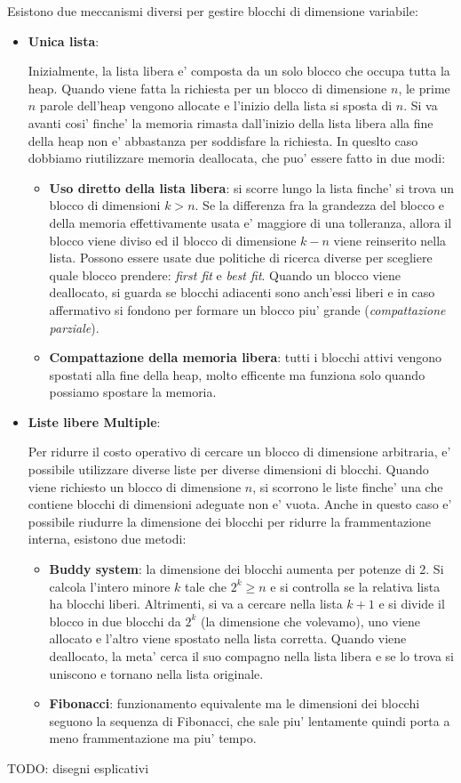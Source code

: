 Esistono due meccanismi diversi per gestire blocchi di dimensione variabile:
\begin{itemize}
\item \textbf{Unica lista}: 

  Inizialmente, la lista libera e' composta da un solo blocco che occupa tutta la heap. Quando viene fatta la richiesta per un blocco di dimensione $ n $, le prime $ n $ parole dell'heap vengono allocate e l'inizio della lista si sposta di $ n $. Si va avanti cosi' finche' la memoria rimasta dall'inizio della lista libera alla fine della heap non e' abbastanza per soddisfare la richiesta. In queslto caso dobbiamo riutilizzare memoria deallocata, che puo' essere fatto in due modi:
    \begin{itemize}
      \item \textbf{Uso diretto della lista libera}: si scorre lungo la lista finche' si trova un blocco di dimensioni $ k > n $. Se la differenza fra la grandezza del blocco e della memoria effettivamente usata e' maggiore di una tolleranza, allora il blocco viene diviso ed il blocco di dimensione $ k - n $ viene reinserito nella lista. Possono essere usate due politiche di ricerca diverse per scegliere quale blocco prendere: \textit{first fit} e \textit{best fit}. Quando un blocco viene deallocato, si guarda se blocchi adiacenti sono anch'essi liberi e in caso affermativo si fondono per formare un blocco piu' grande (\textit{compattazione parziale}).
      \item \textbf{Compattazione della memoria libera}: tutti i blocchi attivi vengono spostati alla fine della heap, molto efficente ma funziona solo quando possiamo spostare la memoria.
    \end{itemize}
  \item \textbf{Liste libere Multiple}:

    Per ridurre il costo operativo di cercare un blocco di dimensione arbitraria, e' possibile utilizzare diverse liste per diverse dimensioni di blocchi. Quando viene richiesto un blocco di dimensione $ n $, si scorrono le liste finche' una che contiene blocchi di dimensioni adeguate non e' vuota. Anche in questo caso e' possibile riudurre la dimensione dei blocchi per ridurre la frammentazione interna, esistono due metodi:
    \begin{itemize}
      \item \textbf{Buddy system}: la dimensione dei blocchi aumenta per potenze di 2. Si calcola l'intero minore $ k $ tale che $ 2^k \geq n $ e si controlla se la relativa lista ha blocchi liberi. Altrimenti, si va a cercare nella lista $ k+1 $ e si divide il blocco in due blocchi da $ 2^k $ (la dimensione che volevamo), uno viene allocato e l'altro viene spostato nella lista corretta. Quando viene deallocato, la meta' cerca il suo compagno nella lista libera e se lo trova si uniscono e tornano nella lista originale.
      \item \textbf{Fibonacci}: funzionamento equivalente ma le dimensioni dei blocchi seguono la sequenza di Fibonacci, che sale piu' lentamente quindi porta a meno frammentazione ma piu' tempo.
    \end{itemize}
\end{itemize}

TODO: disegni esplicativi

% 
